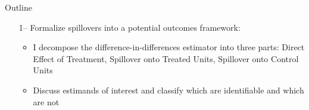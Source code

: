 \documentclass[aspectratio=169,t]{beamer}
\begin{document}
\begin{frame}{Outline}

    \begin{itemize}
        \item[1--] Formalize spillovers into a potential outcomes framework:
 
        \begin{citecolor}
        \end{citecolor}

        \begin{itemize}
            \vspace{2.5mm}
            \item I decompose the difference-in-differences estimator into three parts: Direct Effect of Treatment, Spillover onto Treated Units, Spillover onto Control Units
            
            \vspace{2.5mm}
            \item Discuss estimands of interest and classify which are identifiable and which are not
        \end{itemize} 

    \end{itemize}
\end{frame}
\end{document}
